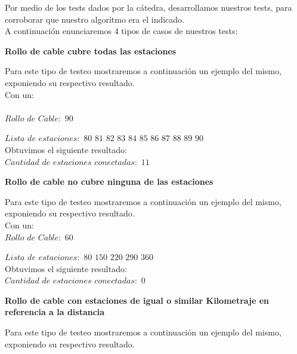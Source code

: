\indent Por medio de los tests dados por la c\'atedra, desarrollamos nuestros tests,
para corroborar que nuestro algoritmo era el indicado.\\

A continuaci\'on enunciaremos 4 tipos de casos de nuestros tests:\\

\begin{center}
 \textbf{Rollo de cable cubre todas las estaciones}
\end{center}
 Para este tipo de testeo mostraremos a continuaci\'on un ejemplo del mismo, exponiendo su respectivo resultado.\\

 Con un:\\\\
  \indent  $Rollo$ $de$ $Cable:$ $90$
  
  $Lista$ $de$ $estaciones:$ $80$ $81$ $82$ $83$ $84$ $85$ $86$ $87$ $88$ $89$ $90$\\
  
  Obtuvimos el siguiente resultado:\\
  
  $Cantidad$ $de$ $estaciones$ $conectadas:$ $11$

 \begin{center}
 \textbf{Rollo de cable no cubre ninguna de las estaciones}
\end{center}

Para este tipo de testeo mostraremos a continuaci\'on un ejemplo del mismo, exponiendo su respectivo resultado.\\

 Con un:\\
  \indent $Rollo$ $de$ $Cable:$ $60$

  $Lista$ $de$ $estaciones:$ $80$ $150$ $220$ $290$ $360$\\
  
  Obtuvimos el siguiente resultado:\\
  
  $Cantidad$ $de$ $estaciones$ $conectadas:$ $0$


\begin{center}
 \textbf{Rollo de cable con estaciones de igual o similar Kilometraje en referencia a la distancia}
\end{center}

Para este tipo de testeo mostraremos a continuaci\'on un ejemplo del mismo, exponiendo su respectivo resultado.\\

